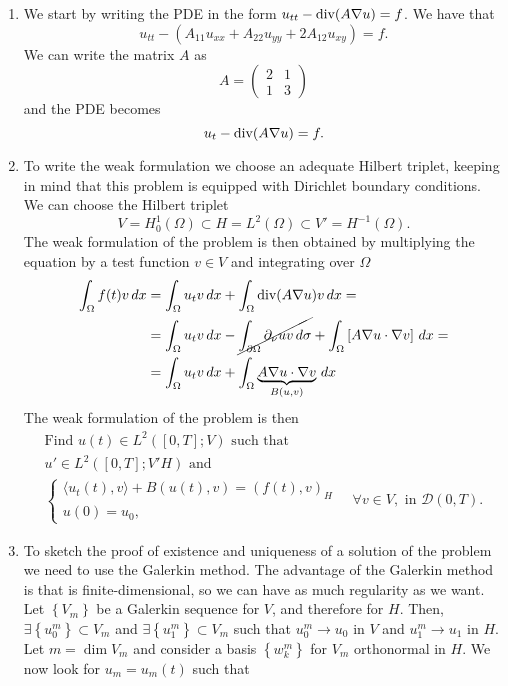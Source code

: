 \begin{enumerate}
    \item We start by writing the PDE in the form \(u_{tt} - \text{div}(A \nabla u) = f\). We have that
    \[
        u_{tt} - \left(A_{11} u_{xx} + A_{22} u_{yy} + 2A_{12} u_{xy}\right) = f.
    \]
    We can write the matrix \(A\) as
    \[
        A = \begin{pmatrix}
            2 & 1 \\
            1 & 3
        \end{pmatrix}
    \]
    and the PDE becomes
    \[
        u_{t} - \text{div} (A \nabla u) = f.
    \]
    \item To write the weak formulation we choose an adequate Hilbert triplet, keeping in mind that this problem is equipped with Dirichlet boundary conditions. We can choose the Hilbert triplet
    \[
        V = H^1_0(\Omega) \subset H = L^2(\Omega) \subset V' = H^{-1}(\Omega).
    \]
    The weak formulation of the problem is then obtained by multiplying the equation by a test function \(v \in V\) and integrating over \(\Omega\)
    \begin{align*}
        \int_\Omega f(t) v \, dx &= \int_\Omega u_{t} v \, dx + \int_\Omega \text{div}(A \nabla u)v \, dx =\\
        &= \int_\Omega u_{t} v \, dx - \cancel{\int_{\partial\Omega} \partial_\nu u v \, d\sigma} + \int_\Omega \left[A \nabla u \cdot \nabla v\right] \, dx = \\
        &= \int_\Omega u_{t} v \, dx + \int_\Omega \underbrace{A \nabla u \cdot \nabla v}_{B(u, v)} \, dx
    \end{align*}
    The weak formulation of the problem is then
    \[
        \begin{split}
            \text{Find } u(t) \in L^2([0, T]; V) \text{ such that } \\
            u' \in L^2([0, T];V'H)\text{ and } \\
            \begin{cases}
                \langle u_{t}(t), v \rangle + B(u(t), v) = (f(t), v)_H \\
                u(0) = u_0,
            \end{cases}\quad \forall v \in V, \text{ in } \mathcal{D}(0, T).
        \end{split}
    \]
    \item To sketch the proof of existence and uniqueness of a solution of the problem we need to use the Galerkin method. The advantage of the Galerkin method is that is finite-dimensional, so we can have as much regularity as we want. Let \(\left\{V_m\right\}\) be a Galerkin sequence for \(V\), and therefore for \(H\). Then, \(\exists \left\{u_0^m\right\} \subset V_m\) and \(\exists \left\{u_1^m\right\} \subset V_m\) such that \(u_0^m \to u_0\) in \(V\) and \(u_1^m \to u_1\) in \(H\). Let \(m = \dim V_m\) and consider a basis \(\left\{w_k^m\right\}\) for \(V_m\) orthonormal in \(H\). We now look for \(u_m = u_m(t)\) such that

\end{enumerate}
